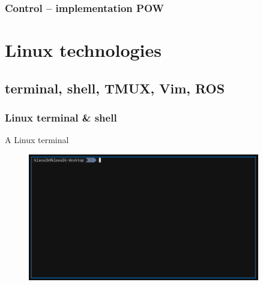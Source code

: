 \documentclass[aspectratio=1610]{beamer}
\begin{document}

\begin{frame}
  \frametitle{Control -- implementation POW}

  \centering
  \begin{figure}
    \begin{adjustbox}{max totalsize={1.0\textwidth}{.85\textheight}, center}
      
    \end{adjustbox}
  \end{figure}

\end{frame}


\section{Linux technologies}
\subsection{terminal, shell, TMUX, Vim, ROS}


\begin{frame}
  \frametitle{Linux terminal \& shell}

  \begin{block}{A Linux terminal}
    \begin{figure}
      \includegraphics[width=0.9\textwidth]{./fig/terminal.png}
    \end{figure}
  \end{block}

\end{frame}
\end{document}
